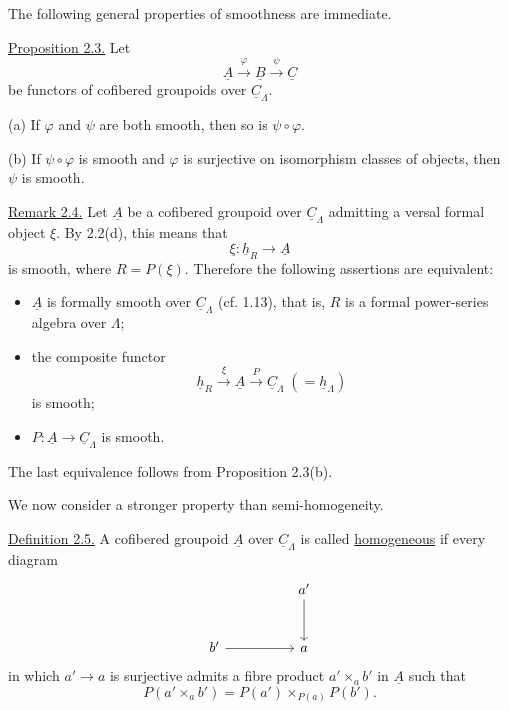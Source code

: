 The following general properties of smoothness are immediate.

\underline{Proposition 2.3.} Let
\[
 \underline A\xrightarrow{\ \varphi\ }\underline B
 \xrightarrow{\ \psi\ }\underline C
\]
be functors of cofibered groupoids over $\underline C_\Lambda$.

(a) If $\varphi$ and $\psi$ are both smooth, then so is
$\psi\circ\varphi$.

(b) If $\psi\circ\varphi$ is smooth and $\varphi$ is surjective on
isomorphism classes of objects, then $\psi$ is smooth.


\underline{Remark 2.4.} Let $\underline A$ be a cofibered groupoid
over $\underline C_\Lambda$ admitting a versal formal object $\xi$.
By 2.2(d), this means that
\[
 \xi:\underline h_R\longrightarrow\underline A
\]
is smooth, where $R=P(\xi)$. Therefore the following assertions are
equivalent:

\begin{itemize}
\item $\underline A$ is formally smooth over $\underline C_\Lambda$
      (cf. 1.13), that is, $R$ is a formal power-series algebra over
      $\Lambda$;
\item the composite functor
      \[
       \underline h_R\xrightarrow{\ \xi\ }\underline A
       \xrightarrow{\ P\ }\underline C_\Lambda
       \;(=\underline h_\Lambda)
      \]
      is smooth;
\item $P:\underline A\longrightarrow\underline C_\Lambda$ is
      smooth.
\end{itemize}
The last equivalence follows from Proposition 2.3(b).

We now consider a stronger property than semi-homogeneity.

\underline{Definition 2.5.} A cofibered groupoid $\underline A$ over
$\underline C_\Lambda$ is called \underline{homogeneous} if every
diagram
\[
\begin{tikzcd}[row sep=large,column sep=huge]
 & a' \arrow[d]\\
 b' \arrow[r] & a
\end{tikzcd}
\]
in which $a'\longrightarrow a$ is surjective admits a fibre product
$a'\times_a b'$ in $\underline A$ such that
\[
 P(a'\times_a b')=
 P(a')\times_{P(a)}P(b').
\]

